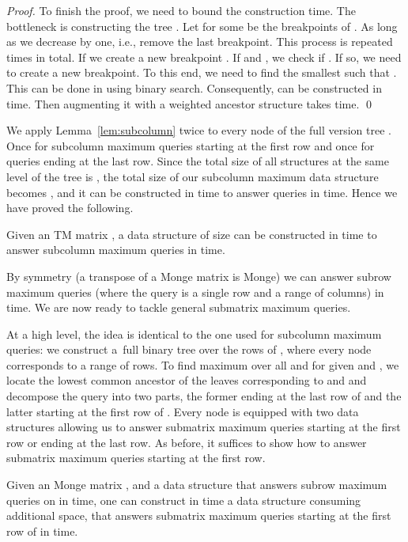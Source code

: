 \documentclass{llncs}
\begin{document}
\begin{proof}
To finish the proof, we need to bound the construction time. The bottleneck is constructing
the tree . Let  for some  be the breakpoints of . As long as
 we decrease  by one, i.e., remove the last breakpoint.
This process is repeated  times in total. If  we create a new breakpoint
. 
If  and  , we check if .
If so, we need to create a new breakpoint. To this end, we need to find the smallest  such
that . This can be done in
 using binary search. Consequently,  can be constructed in  time. Then augmenting
it with a weighted ancestor structure takes  time.
\qed \end{proof}

We apply Lemma~\ref{lem:subcolumn} twice to every node of the full version tree .
Once for subcolumn maximum queries starting at the first row and once for queries ending at the last row. Since the total
size of all structures at the same level of the tree is , the total size of our subcolumn
maximum data structure becomes , and it can be constructed in 
time to answer queries in  time. Hence we have proved
the following.

\begin{theorem}
\label{thm:subcolumn}
Given an  TM matrix , a data structure of size  can be constructed
in  time to answer subcolumn maximum queries in  time.
\end{theorem}

By symmetry (a transpose of a Monge matrix is Monge) we can answer subrow maximum
queries (where the query is a single row and a range of columns) in
 time. We are now ready to
tackle general submatrix maximum queries.


At a high level, the idea is identical to the one used for subcolumn maximum queries: we construct
a~full binary tree  over the rows of , where every node corresponds to a range of rows. To
find maximum  over all  and
 for given  and , we locate the lowest
common ancestor of the leaves corresponding to  and  and decompose
the query into two parts, the former ending at the last row of  and the latter
starting at the first row of . Every node is equipped with two data structures
allowing us to answer submatrix maximum queries starting at the first row or ending
at the last row. As before, it suffices to show how to answer submatrix maximum queries starting
at the first row.

\begin{lemma}
\label{lem:submatrix}
Given an  Monge matrix , and a data structure that
answers subrow maximum queries on  in  time, one can
construct in  time  a data structure consuming 
additional space, that answers submatrix maximum queries starting at
the first row of  in  time.
\end{lemma}
\end{document}
